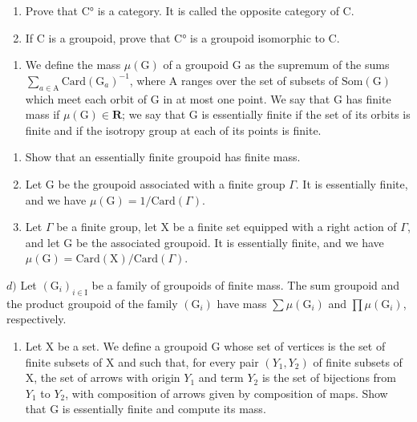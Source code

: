 \begin{enumerate}
\def\labelenumi{\alph{enumi})}
\item
  Prove that C° is a category. It is called the opposite category of C.
\item
  If C is a groupoid, prove that C° is a groupoid isomorphic to C.
\end{enumerate}

\begin{enumerate}
\def\labelenumi{\arabic{enumi})}
\setcounter{enumi}{3}
\tightlist
\item
  We define the mass \(\mu(\mathrm{G})\) of a groupoid G as the supremum of the sums \(\sum_{a\in\mathrm{A}}\mathrm{Card}(\mathrm{G}_{a})^{-1}\), where A ranges over the set of subsets of \(\mathrm{Som}(\mathrm{G})\) which meet each orbit of G in at most one point. We say that G has finite mass if \(\mu(\mathrm{G})\in\mathbf{R}\); we say that G is essentially finite if the set of its orbits is finite and if the isotropy group at each of its points is finite.
\end{enumerate}

\begin{enumerate}
\def\labelenumi{\alph{enumi})}
\item
  Show that an essentially finite groupoid has finite mass.
\item
  Let G be the groupoid associated with a finite group \(\Gamma\). It is essentially finite, and we have \(\mu(\mathrm{G}) = 1/\mathrm{Card}(\Gamma)\).
\item
  Let \(\Gamma\) be a finite group, let X be a finite set equipped with a right action of \(\Gamma\), and let G be the associated groupoid. It is essentially finite, and we have \(\mu(\mathrm{G}) = \mathrm{Card}(\mathrm{X}) / \mathrm{Card}(\Gamma)\).
\end{enumerate}

\(d)\) Let \((\mathrm{G}_i)_{i\in \mathrm{I}}\) be a family of groupoids of finite mass. The sum groupoid and the product groupoid of the family \((\mathrm{G}_i)\) have mass \(\sum \mu (\mathrm{G}_i)\) and \(\prod \mu (\mathrm{G}_i)\), respectively.

\begin{enumerate}
\def\labelenumi{\alph{enumi})}
\setcounter{enumi}{4}
\tightlist
\item
  Let X be a set. We define a groupoid G whose set of vertices is the set of finite subsets of X and such that, for every pair \((Y_{1}, Y_{2})\) of finite subsets of X, the set of arrows with origin \(Y_{1}\) and term \(Y_{2}\) is the set of bijections from \(Y_{1}\) to \(Y_{2}\), with composition of arrows given by composition of maps. Show that G is essentially finite and compute its mass.
\end{enumerate}

